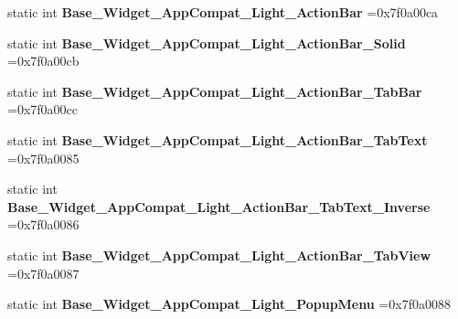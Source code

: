 \begin{DoxyCompactItemize}
static int {\bfseries Base\+\_\+\+Widget\+\_\+\+App\+Compat\+\_\+\+Light\+\_\+\+Action\+Bar} =0x7f0a00ca
\item 
\mbox{\label{classandroid_1_1support_1_1graphics_1_1drawable_1_1R_1_1style_ab4af0a1e993eaa1d3283ab8e846728ae}} 
static int {\bfseries Base\+\_\+\+Widget\+\_\+\+App\+Compat\+\_\+\+Light\+\_\+\+Action\+Bar\+\_\+\+Solid} =0x7f0a00cb
\item 
\mbox{\label{classandroid_1_1support_1_1graphics_1_1drawable_1_1R_1_1style_afd05b401d6a0ab52d49fde343cff8af8}} 
static int {\bfseries Base\+\_\+\+Widget\+\_\+\+App\+Compat\+\_\+\+Light\+\_\+\+Action\+Bar\+\_\+\+Tab\+Bar} =0x7f0a00cc
\item 
\mbox{\label{classandroid_1_1support_1_1graphics_1_1drawable_1_1R_1_1style_ae882aabdc447be798539db36ff62b251}} 
static int {\bfseries Base\+\_\+\+Widget\+\_\+\+App\+Compat\+\_\+\+Light\+\_\+\+Action\+Bar\+\_\+\+Tab\+Text} =0x7f0a0085
\item 
\mbox{\label{classandroid_1_1support_1_1graphics_1_1drawable_1_1R_1_1style_ae4ba45089d763fd35f4a243bf4e47abf}} 
static int {\bfseries Base\+\_\+\+Widget\+\_\+\+App\+Compat\+\_\+\+Light\+\_\+\+Action\+Bar\+\_\+\+Tab\+Text\+\_\+\+Inverse} =0x7f0a0086
\item 
\mbox{\label{classandroid_1_1support_1_1graphics_1_1drawable_1_1R_1_1style_a6b5bf27f4f01a0547942fd39d8b5ec77}} 
static int {\bfseries Base\+\_\+\+Widget\+\_\+\+App\+Compat\+\_\+\+Light\+\_\+\+Action\+Bar\+\_\+\+Tab\+View} =0x7f0a0087
\item 
\mbox{\label{classandroid_1_1support_1_1graphics_1_1drawable_1_1R_1_1style_a2203b9e265dafa42938285bbe1e2ee1b}} 
static int {\bfseries Base\+\_\+\+Widget\+\_\+\+App\+Compat\+\_\+\+Light\+\_\+\+Popup\+Menu} =0x7f0a0088
\item 
\mbox{\label{classandroid_1_1support_1_1graphics_1_1drawable_1_1R_1_1style_a449dd10485fc9bb03cc3cacc2d09553a}} 

\end{DoxyCompactItemize}
